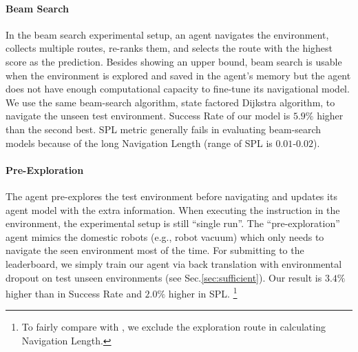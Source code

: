 \documentclass[11pt,a4paper]{article}
\begin{document}
\paragraph{Beam Search}
In the beam search experimental setup, 
an agent navigates the environment, collects multiple routes, re-ranks them, and selects the route with the highest score as the prediction.
Besides showing an upper bound,
beam search is usable when the environment is explored and saved in the agent's memory but the agent does not have enough computational capacity to fine-tune its navigational model. 
We use the same beam-search algorithm, state factored Dijkstra algorithm, to navigate the unseen test environment. 
Success Rate of our model is $5.9\%$ higher than the second best.
SPL metric generally fails in evaluating beam-search models because of the long Navigation Length (range of SPL is $0.01$-$0.02$).

\paragraph{Pre-Exploration}
The agent pre-explores the test environment before navigating and updates its agent model with the extra information.
When executing the instruction in the environment, the experimental setup is still ``single run''.
The ``pre-exploration'' agent mimics the domestic robots (e.g., robot vacuum) which only needs to navigate the seen environment most of the time.
For submitting to the leaderboard, we simply train our agent via back translation with environmental dropout on test unseen environments (see Sec.\ref{sec:sufficient}).
Our result is $3.4\%$ higher than  in Success Rate and $2.0\%$ higher in SPL.
\footnote{To fairly compare with , we exclude the exploration route in calculating Navigation Length.}
\end{document}
